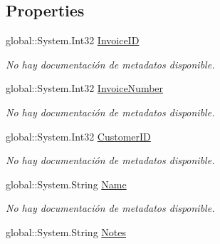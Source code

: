 \subsection*{Properties}
\begin{DoxyCompactItemize}
\item 
global\-::\-System.\-Int32 \hyperlink{class_microsoft_1_1_samples_1_1_kinect_1_1_basic_interactions_1_1_invoices_a0184f14c5a64ce9c102a2feee3f93e14}{Invoice\-I\-D}
\begin{DoxyCompactList}\small\item\em No hay documentación de metadatos disponible. \end{DoxyCompactList}\item 
global\-::\-System.\-Int32 \hyperlink{class_microsoft_1_1_samples_1_1_kinect_1_1_basic_interactions_1_1_invoices_a1a44811b8a01c4cd21e364486986ebe2}{Invoice\-Number}
\begin{DoxyCompactList}\small\item\em No hay documentación de metadatos disponible. \end{DoxyCompactList}\item 
global\-::\-System.\-Int32 \hyperlink{class_microsoft_1_1_samples_1_1_kinect_1_1_basic_interactions_1_1_invoices_a5eab4d8c701a9f60d2399f326d160e2a}{Customer\-I\-D}
\begin{DoxyCompactList}\small\item\em No hay documentación de metadatos disponible. \end{DoxyCompactList}\item 
global\-::\-System.\-String \hyperlink{class_microsoft_1_1_samples_1_1_kinect_1_1_basic_interactions_1_1_invoices_a452599de7a8090dced2c4df0cd75f775}{Name}
\begin{DoxyCompactList}\small\item\em No hay documentación de metadatos disponible. \end{DoxyCompactList}\item 
global\-::\-System.\-String \hyperlink{class_microsoft_1_1_samples_1_1_kinect_1_1_basic_interactions_1_1_invoices_a242d08345a507c6a7a9470549cea5b3b}{Notes}

\end{DoxyCompactItemize}
